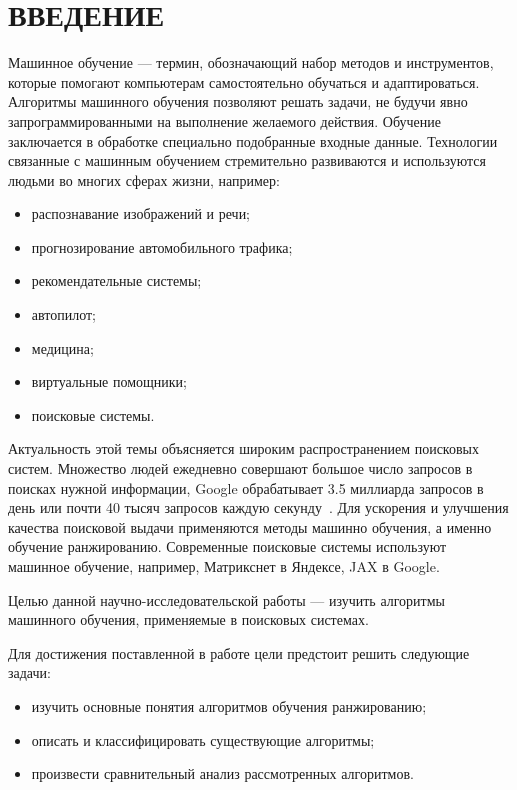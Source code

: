 \chapter*{ВВЕДЕНИЕ}

Машинное обучение --- термин, обозначающий набор методов и инструментов, которые помогают компьютерам самостоятельно обучаться и адаптироваться. Алгоритмы машинного обучения позволяют решать задачи, не будучи явно запрограммированными на выполнение желаемого действия. Обучение заключается в обработке специально подобранные входные данные. Технологии связанные с машинным обучением стремительно развиваются и используются людьми во многих сферах жизни, например:

\begin{itemize}[label=---]
	\item распознавание изображений и речи;
	\item прогнозирование автомобильного трафика;
	\item рекомендательные системы;
	\item автопилот;
	\item медицина;
	\item виртуальные помощники;
	\item поисковые системы.
\end{itemize}

Актуальность этой темы объясняется широким распространением поисковых систем. Множество людей ежедневно совершают большое число запросов в поисках нужной информации, Google обрабатывает 3.5 миллиарда запросов в день или почти 40 тысяч запросов каждую секунду~\cite{google}. Для ускорения и улучшения качества поисковой выдачи применяются методы машинно обучения, а именно обучение ранжированию. Современные поисковые системы используют машинное обучение, например, Матрикснет в Яндексе, JAX в Google.

Целью данной научно-исследовательской работы --- изучить алгоритмы машинного обучения, применяемые в поисковых системах. 

Для достижения поставленной в работе цели предстоит решить следующие задачи:
\begin{itemize}[label=---]
	\item изучить основные понятия алгоритмов обучения ранжированию;
	\item описать и классифицировать существующие алгоритмы;
	\item произвести сравнительный анализ рассмотренных алгоритмов.
\end{itemize}


